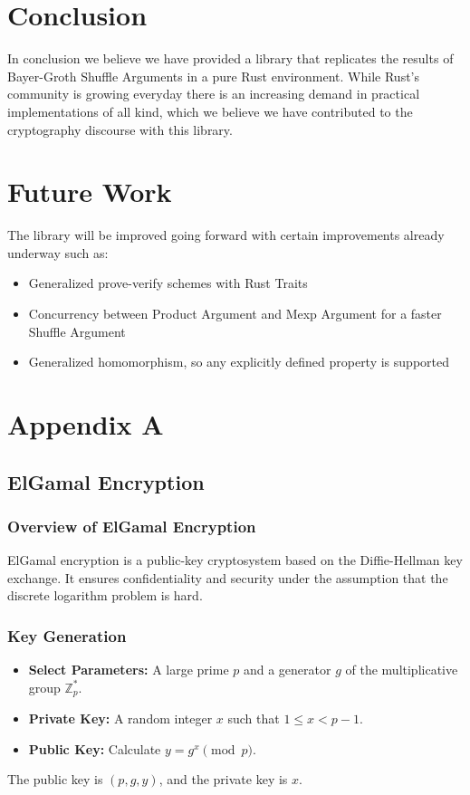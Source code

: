\documentclass[12pt,a4paper]{report}
\begin{document}
\chapter{Conclusion}
In conclusion we believe we have provided a library that replicates the results of Bayer-Groth Shuffle Arguments in a pure Rust environment. 
While Rust's community is growing everyday there is an increasing demand in practical implementations of all kind, which we believe we have contributed to the cryptography discourse with this library.

\chapter{Future Work}
The library will be improved going forward with certain improvements already underway such as:
\begin{itemize}
	\item Generalized prove-verify schemes with Rust Traits
	\item Concurrency between Product Argument and Mexp Argument for a faster Shuffle Argument
	\item Generalized homomorphism, so any explicitly defined property is supported
\end{itemize}

\newpage
{}



\appendix
\chapter{Appendix A}
\section{ElGamal Encryption}

\subsection{Overview of ElGamal Encryption}
ElGamal encryption is a public-key cryptosystem based on the Diffie-Hellman key exchange. It ensures confidentiality and security under the assumption that the discrete logarithm problem is hard.

\subsection{Key Generation}
\begin{itemize}
    \item \textbf{Select Parameters:} A large prime \( p \) and a generator \( g \) of the multiplicative group \( \mathbb{Z}_p^* \).
    \item \textbf{Private Key:} A random integer \( x \) such that \( 1 \leq x < p-1 \).
    \item \textbf{Public Key:} Calculate \( y = g^x \pmod p \).
\end{itemize}
The public key is \( (p, g, y) \), and the private key is \( x \).
\end{document}
